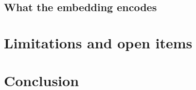 \documentclass[11pt]{article}
\begin{document}
\subsection{What the embedding encodes}

\section{Limitations and open items}

\section{Conclusion}



\end{document}
